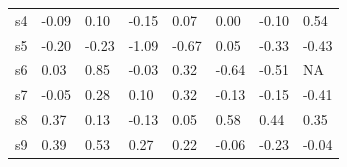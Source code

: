 \begin{table}[]
\begin{tabular}{llllllll}
s4  & -0.09                                                         & \cellcolor[HTML]{C0C0C0}0.10                                 & -0.15                                                                   & \cellcolor[HTML]{EFEFEF}0.07 & 0.00                                                             & -0.10                                                                & \cellcolor[HTML]{C0C0C0}0.54                                               \\
s5  & -0.20                                                         & -0.23                                                        & -1.09                                                                   & -0.67                        & \cellcolor[HTML]{EFEFEF}0.05                                     & -0.33                                                                & -0.43                                                                      \\
s6  & \cellcolor[HTML]{EFEFEF}0.03                                  & \cellcolor[HTML]{9B9B9B}0.85                                 & -0.03                                                                   & \cellcolor[HTML]{C0C0C0}0.32 & -0.64                                                            & -0.51                                                                & NA                                                                         \\
s7  & -0.05                                                         & \cellcolor[HTML]{C0C0C0}0.28                                 & \cellcolor[HTML]{C0C0C0}0.10                                            & \cellcolor[HTML]{C0C0C0}0.32 & -0.13                                                            & -0.15                                                                & -0.41                                                                      \\
s8  & \cellcolor[HTML]{C0C0C0}0.37                                  & \cellcolor[HTML]{C0C0C0}0.13                                 & -0.13                                                                   & \cellcolor[HTML]{EFEFEF}0.05 & \cellcolor[HTML]{C0C0C0}0.58                                     & \cellcolor[HTML]{C0C0C0}0.44                                         & \cellcolor[HTML]{C0C0C0}0.35                                               \\
s9  & \cellcolor[HTML]{C0C0C0}0.39                                  & \cellcolor[HTML]{C0C0C0}0.53                                 & \cellcolor[HTML]{C0C0C0}0.27                                            & \cellcolor[HTML]{C0C0C0}0.22 & -0.06                                                            & -0.23                                                                & -0.04                                                                      \\

\end{tabular}
\end{table}

